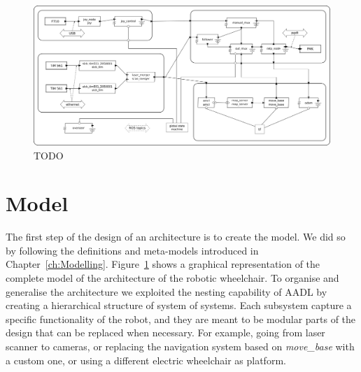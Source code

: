 \begin{landscape}
	\begin{figure}[t]
	\centering
	\includegraphics[width=0.95\textheight]{gfx/pmk/model}
	\caption{TODO}
	\label{fig:pmk-model}
	\end{figure}
\end{landscape}


\section{Model}
\label{sec:pmk-model}
The first step of the design of an architecture is to create the model. We did so by following the definitions and meta-models introduced in Chapter~\ref{ch:Modelling}. Figure~\ref{fig:pmk-model} shows a graphical representation of the complete model of the architecture of the robotic wheelchair. To organise and generalise the architecture we exploited the nesting capability of AADL by creating a hierarchical structure of system of systems. Each subsystem capture a specific functionality of the robot, and they are meant to be modular parts of the design that can be replaced when necessary. For example, going from laser scanner to cameras, or replacing the navigation system based on \textit{move\_base} with a custom one, or using a different electric wheelchair as platform.

